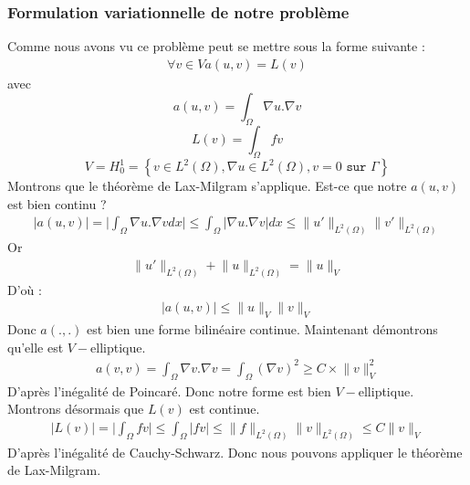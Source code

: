 \subsubsection{Formulation variationnelle de notre problème}
Comme nous avons vu ce problème peut se mettre sous la forme suivante :
\begin{align*}
\forall v\in V a(u,v)=L(v)
\end{align*}
avec
\begin{equation*}
a(u,v)=\int_{\Omega}\nabla u.\nabla v
\end{equation*}
\begin{equation*}
L(v)=\int_{\Omega}fv
\end{equation*}
\begin{equation*}
V=H_{0}^{1}=\left\{v\in L^{2}\left(\Omega\right), \nabla u\in L^{2}\left(\Omega\right), v=0 \texttt{ sur }\Gamma\right\}
\end{equation*}
Montrons que le théorème de Lax-Milgram s'applique.
Est-ce que notre $a(u,v)$ est bien continu ?
\begin{align*}
\lvert a\left( u,v\right)\rvert=\lvert \int_{\Omega}\nabla u.\nabla v dx\rvert\leq \int_{\Omega} \lvert\nabla u.\nabla v\rvert dx \leq \lVert u'\rVert_{L^{2}\left(\Omega\right)}\lVert v'\rVert_{L^{2}\left(\Omega\right)}
\end{align*}
Or
\begin{align*}
\lVert u'\rVert_{L^{2}\left(\Omega\right)}+\lVert u\rVert_{L^{2}\left(\Omega\right)}=\lVert u\rVert_{V}
\end{align*}
D'où :
\begin{align*}
\lvert a\left( u,v\right)\rvert\leq \lVert u \rVert_{V}\lVert v \rVert_{V}
\end{align*}
Donc $a\left(.,.\right)$ est bien une forme bilinéaire continue. Maintenant démontrons qu'elle est $V-$elliptique.
\begin{align*}
a(v,v)=\int_{\Omega}\nabla v.\nabla v=\int_{\Omega} \left(\nabla v\right)^{2}\geq C\times \lVert v\rVert_{V}^{2}
\end{align*}
D'après l'inégalité de Poincaré. Donc notre forme est bien $V-$elliptique. Montrons désormais que $L(v)$ est continue.
\begin{align*}
\lvert L(v)\rvert=\lvert\int_{\Omega}fv\rvert\leq \int_{\Omega}\lvert fv\rvert \leq \lVert f\rVert_{L^{2}(\Omega)}\lVert v\rVert_{L^{2}(\Omega)}\leq C \lVert v\rVert_{V}
\end{align*}
D'après l'inégalité de Cauchy-Schwarz. Donc nous pouvons appliquer le théorème de Lax-Milgram.
